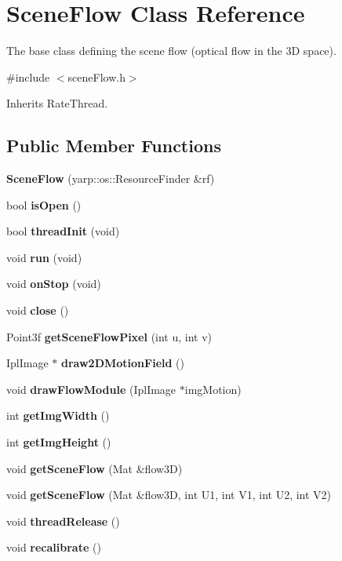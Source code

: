 \section{Scene\+Flow Class Reference}
\label{classSceneFlow}


The base class defining the scene flow (optical flow in the 3D space).  




{\ttfamily \#include $<$scene\+Flow.\+h$>$}



Inherits Rate\+Thread.

\subsection*{Public Member Functions}
\begin{DoxyCompactItemize}
\item 
\mbox{\label{classSceneFlow_a09a89df061b9ec7a6964f7d82d8272eb}} 
{\bfseries Scene\+Flow} (yarp\+::os\+::\+Resource\+Finder \&rf)
\item 
\mbox{\label{classSceneFlow_a360b8be98c1c11f3543b6c0744f4da82}} 
bool {\bfseries is\+Open} ()
\item 
\mbox{\label{classSceneFlow_a8603d1225367313e78d74d5453afc647}} 
bool {\bfseries thread\+Init} (void)
\item 
\mbox{\label{classSceneFlow_a88ebf1f92e8d45073ac603dac1073c38}} 
void {\bfseries run} (void)
\item 
\mbox{\label{classSceneFlow_a87be5bb61cff579f919a496748d33b0b}} 
void {\bfseries on\+Stop} (void)
\item 
\mbox{\label{classSceneFlow_a3c734406548b2f720c22302ded2233cd}} 
void {\bfseries close} ()
\item 
\mbox{\label{classSceneFlow_abff8df2a30a081071c27c86c680d9c91}} 
Point3f {\bfseries get\+Scene\+Flow\+Pixel} (int u, int v)
\item 
\mbox{\label{classSceneFlow_a9a4241e4f2feb15510e8d83a6f8918e8}} 
Ipl\+Image $\ast$ {\bfseries draw2\+D\+Motion\+Field} ()
\item 
\mbox{\label{classSceneFlow_a546f4515e88a56dea1c9fc02d585d550}} 
void {\bfseries draw\+Flow\+Module} (Ipl\+Image $\ast$img\+Motion)
\item 
\mbox{\label{classSceneFlow_a0844d30b0f1c10828f2144eb446e99fb}} 
int {\bfseries get\+Img\+Width} ()
\item 
\mbox{\label{classSceneFlow_a3c0fbe6df132fba94a0b24a8d1e90661}} 
int {\bfseries get\+Img\+Height} ()
\item 
\mbox{\label{classSceneFlow_a8920f6b49c46d524fa543ac1e55c18e8}} 
void {\bfseries get\+Scene\+Flow} (Mat \&flow3D)
\item 
\mbox{\label{classSceneFlow_a82e1c079533882d4662fa29853d02f76}} 
void {\bfseries get\+Scene\+Flow} (Mat \&flow3D, int U1, int V1, int U2, int V2)
\item 
\mbox{\label{classSceneFlow_a999d87ea72266a0fc258b94a95fa48ec}} 
void {\bfseries thread\+Release} ()
\item 
\mbox{\label{classSceneFlow_aecfc668fbb7d6800010abfe424a37aae}} 
void {\bfseries recalibrate} ()
\end{DoxyCompactItemize}


